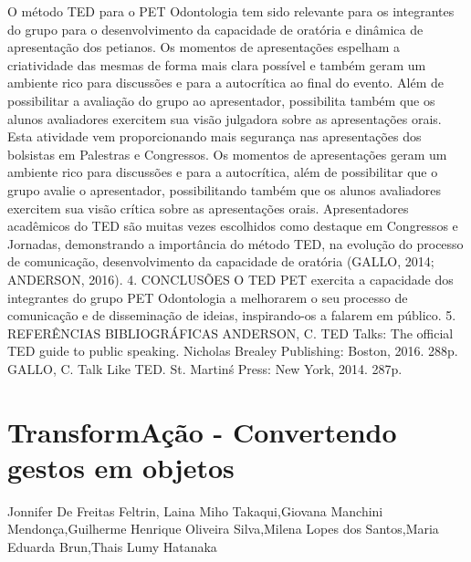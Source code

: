 O método TED para o PET Odontologia tem sido relevante para os integrantes do grupo para
o desenvolvimento da capacidade de oratória e dinâmica de apresentação dos petianos. Os
momentos de apresentações espelham a criatividade das mesmas de forma mais clara possível e
também geram um ambiente rico para discussões e para a autocrítica ao final do evento. Além de
possibilitar a avaliação do grupo ao apresentador, possibilita também que os alunos avaliadores
exercitem sua visão julgadora sobre as apresentações orais. Esta atividade vem proporcionando
mais segurança nas apresentações dos bolsistas em Palestras e Congressos.
Os momentos de apresentações geram um ambiente rico para discussões e para a autocrítica,
além de possibilitar que o grupo avalie o apresentador, possibilitando também que os alunos
avaliadores exercitem sua visão crítica sobre as apresentações orais.
Apresentadores acadêmicos do TED são muitas vezes escolhidos como destaque em
Congressos e Jornadas, demonstrando a importância do método TED, na evolução do processo de
comunicação, desenvolvimento da capacidade de oratória (GALLO, 2014; ANDERSON, 2016).
4. CONCLUSÕES
O TED PET exercita a capacidade dos integrantes do grupo PET Odontologia a melhorarem
o seu processo de comunicação e de disseminação de ideias, inspirando-os a falarem em público.
5. REFERÊNCIAS BIBLIOGRÁFICAS
ANDERSON, C. TED Talks: The official TED guide to public speaking. Nicholas Brealey
Publishing: Boston, 2016. 288p.
GALLO, C. Talk Like TED. St. Martin\'s Press: New York, 2014. 287p.



\section{TransformAção - Convertendo gestos em objetos}

Jonnifer De Freitas Feltrin, Laina Miho Takaqui,Giovana Manchini Mendonça,Guilherme Henrique Oliveira Silva,Milena Lopes dos Santos,Maria Eduarda Brun,Thais Lumy Hatanaka

